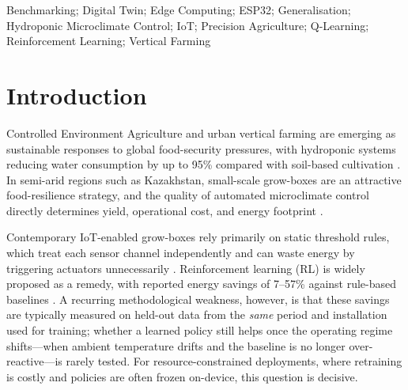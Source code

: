 \documentclass[conference]{IEEEtran}
\begin{document}
\begin{IEEEkeywords}
Benchmarking; Digital Twin; Edge Computing; ESP32; Generalisation;
Hydroponic Microclimate Control; IoT; Precision Agriculture; Q-Learning;
Reinforcement Learning; Vertical Farming
\end{IEEEkeywords}

\section{Introduction}
Controlled Environment Agriculture and urban vertical farming are emerging as
sustainable responses to global food-security pressures, with hydroponic systems
reducing water consumption by up to 95\% compared with soil-based cultivation
\cite{kozai2022,oh2023}. In semi-arid regions such as Kazakhstan, small-scale
grow-boxes are an attractive food-resilience strategy, and the quality of
automated microclimate control directly determines yield, operational cost, and
energy footprint \cite{wolfert2017,sneineh2023}.

Contemporary IoT-enabled grow-boxes rely primarily on static threshold rules,
which treat each sensor channel independently and can waste energy by triggering
actuators unnecessarily \cite{ferentinos2017,tzounis2017}. Reinforcement learning
(RL) is widely proposed as a remedy, with reported energy savings of 7--57\%
against rule-based baselines \cite{adesanya2024,ajagekar2022}. A recurring
methodological weakness, however, is that these savings are typically measured on
held-out data from the \emph{same} period and installation used for training;
whether a learned policy still helps once the operating regime shifts---when
ambient temperature drifts and the baseline is no longer over-reactive---is
rarely tested. For resource-constrained deployments, where retraining is costly
and policies are often frozen on-device, this question is decisive.
\end{document}
